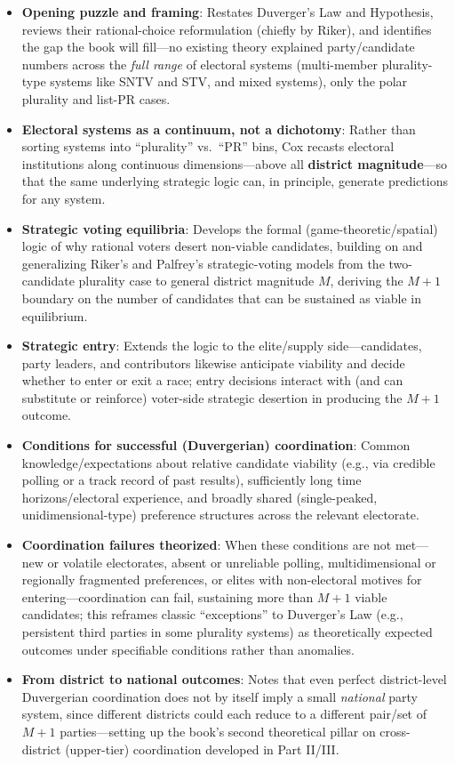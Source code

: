 \documentclass[12pt]{article}
\begin{document}
\begin{itemize}[leftmargin=*, itemsep=4pt]
    \item \textbf{Opening puzzle and framing}: Restates Duverger's Law and Hypothesis, reviews their rational-choice reformulation (chiefly by Riker), and identifies the gap the book will fill---no existing theory explained party/candidate numbers across the \emph{full range} of electoral systems (multi-member plurality-type systems like SNTV and STV, and mixed systems), only the polar plurality and list-PR cases.
    \item \textbf{Electoral systems as a continuum, not a dichotomy}: Rather than sorting systems into ``plurality'' vs.\ ``PR'' bins, Cox recasts electoral institutions along continuous dimensions---above all \textbf{district magnitude}---so that the same underlying strategic logic can, in principle, generate predictions for any system.
    \item \textbf{Strategic voting equilibria}: Develops the formal (game-theoretic/spatial) logic of why rational voters desert non-viable candidates, building on and generalizing Riker's and Palfrey's strategic-voting models from the two-candidate plurality case to general district magnitude $M$, deriving the $M+1$ boundary on the number of candidates that can be sustained as viable in equilibrium.
    \item \textbf{Strategic entry}: Extends the logic to the elite/supply side---candidates, party leaders, and contributors likewise anticipate viability and decide whether to enter or exit a race; entry decisions interact with (and can substitute or reinforce) voter-side strategic desertion in producing the $M+1$ outcome.
    \item \textbf{Conditions for successful (Duvergerian) coordination}: Common knowledge/expectations about relative candidate viability (e.g., via credible polling or a track record of past results), sufficiently long time horizons/electoral experience, and broadly shared (single-peaked, unidimensional-type) preference structures across the relevant electorate.
    \item \textbf{Coordination failures theorized}: When these conditions are not met---new or volatile electorates, absent or unreliable polling, multidimensional or regionally fragmented preferences, or elites with non-electoral motives for entering---coordination can fail, sustaining more than $M+1$ viable candidates; this reframes classic ``exceptions'' to Duverger's Law (e.g., persistent third parties in some plurality systems) as theoretically expected outcomes under specifiable conditions rather than anomalies.
    \item \textbf{From district to national outcomes}: Notes that even perfect district-level Duvergerian coordination does not by itself imply a small \emph{national} party system, since different districts could each reduce to a different pair/set of $M+1$ parties---setting up the book's second theoretical pillar on cross-district (upper-tier) coordination developed in Part II/III.
\end{itemize}
\end{document}
